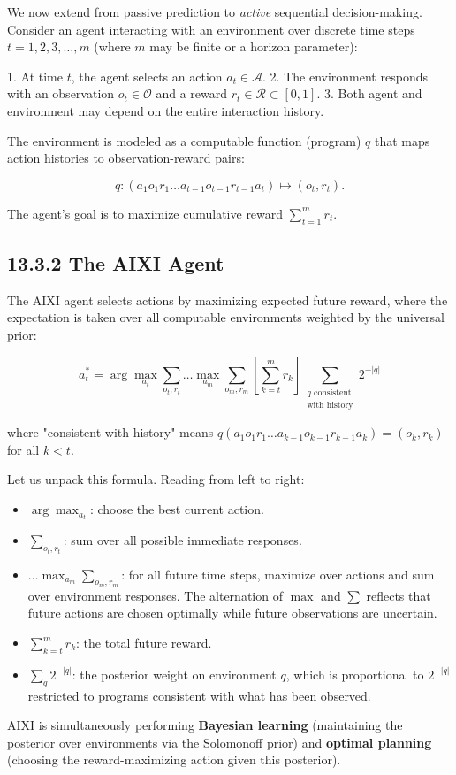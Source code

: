 We now extend from passive prediction to \textit{active} sequential decision-making. Consider an agent interacting with an environment over discrete time steps $t = 1, 2, 3, \ldots, m$ (where $m$ may be finite or a horizon parameter):

1. At time $t$, the agent selects an action $a_t \in \mathcal{A}$.
2. The environment responds with an observation $o_t \in \mathcal{O}$ and a reward $r_t \in \mathcal{R} \subset [0, 1]$.
3. Both agent and environment may depend on the entire interaction history.

The environment is modeled as a computable function (program) $q$ that maps action histories to observation-reward pairs:

\[q: (a_1 o_1 r_1 \ldots a_{t-1} o_{t-1} r_{t-1} a_t) \mapsto (o_t, r_t).\]

The agent's goal is to maximize cumulative reward $\sum_{t=1}^m r_t$.

\subsection{13.3.2 The AIXI Agent}

\begin{definition}
The AIXI agent selects actions by maximizing expected future reward, where the expectation is taken over all computable environments weighted by the universal prior:

\[a_t^* = \arg\max_{a_t} \sum_{o_t, r_t} \ldots \max_{a_m} \sum_{o_m, r_m} \left[\sum_{k=t}^{m} r_k \right] \sum_{\substack{q \text{ consistent} \\ \text{with history}}} 2^{-|q|}\]

where "consistent with history" means $q(a_1 o_1 r_1 \ldots a_{k-1} o_{k-1} r_{k-1} a_k) = (o_k, r_k)$ for all $k < t$.

Let us unpack this formula. Reading from left to right:

\begin{itemize}
\item $\arg\max_{a_t}$: choose the best current action.
\item $\sum_{o_t, r_t}$: sum over all possible immediate responses.
\item $\ldots \max_{a_m} \sum_{o_m, r_m}$: for all future time steps, maximize over actions and sum over environment responses. The alternation of $\max$ and $\sum$ reflects that future actions are chosen optimally while future observations are uncertain.
\item $\sum_{k=t}^{m} r_k$: the total future reward.
\item $\sum_{q} 2^{-|q|}$: the posterior weight on environment $q$, which is proportional to $2^{-|q|}$ restricted to programs consistent with what has been observed.

\end{itemize}
AIXI is simultaneously performing \textbf{Bayesian learning} (maintaining the posterior over environments via the Solomonoff prior) and \textbf{optimal planning} (choosing the reward-maximizing action given this posterior).
\end{definition}

